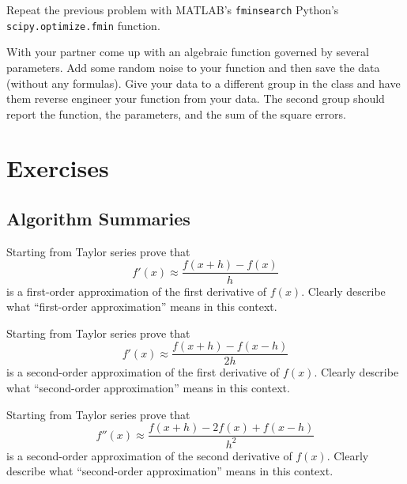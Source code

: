 \begin{problem}
    Repeat the previous problem with 
    \ifnum{} MATLAB's \texttt{fminsearch}
    \else
    Python's \texttt{scipy.optimize.fmin}
    \fi
    function.
\end{problem}

\begin{problem}
    With your partner come up with an algebraic function governed by several parameters.
    Add some random noise to your function and then save the data (without any formulas).
    Give your data to a different group in the class and have them reverse engineer your
    function from your data.  The second group should report the function, the parameters,
    and the sum of the square errors.
\end{problem}





\newpage\section{Exercises}

\subsection{Algorithm Summaries}

\begin{problem}
    Starting from Taylor series prove that 
    \[ f'(x) \approx \frac{f(x+h) - f(x)}{h} \]
    is a first-order approximation of the first derivative of $f(x)$.  Clearly describe
    what ``first-order approximation'' means in this context.
\end{problem}

\begin{problem}
    Starting from Taylor series prove that 
    \[ f'(x) \approx \frac{f(x+h) - f(x-h)}{2h} \]
    is a second-order approximation of the first derivative of $f(x)$.  Clearly describe
    what ``second-order approximation'' means in this context.
\end{problem}

\begin{problem}
    Starting from Taylor series prove that 
    \[ f''(x) \approx \frac{f(x+h) - 2f(x) + f(x-h)}{h^2} \]
    is a second-order approximation of the second derivative of $f(x)$.  Clearly describe
    what ``second-order approximation'' means in this context.
\end{problem}

